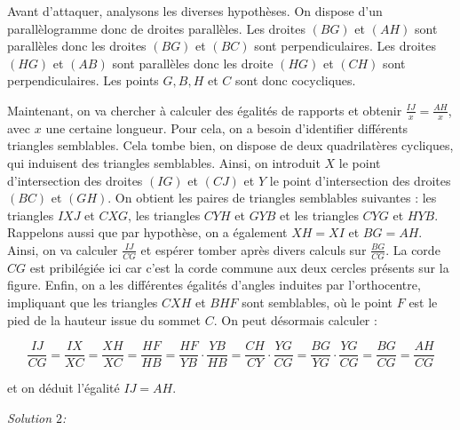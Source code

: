 \begin{sol}
Avant d'attaquer, analysons les diverses hypothèses. On dispose d'un parallèlogramme donc de droites parallèles. Les droites $(BG)$ et $(AH)$ sont parallèles donc les droites $(BG)$ et $(BC)$ sont perpendiculaires. Les droites $(HG)$ et $(AB)$ sont parallèles donc les droite $(HG)$ et $(CH)$ sont perpendiculaires. Les points $G,B,H$ et $C$ sont donc cocycliques.

Maintenant, on va chercher à calculer des égalités de rapports et obtenir $\frac{IJ}{x}=\frac{AH}{x}$, avec $x$ une certaine longueur. Pour cela, on a besoin d'identifier différents triangles semblables. Cela tombe bien, on dispose de deux quadrilatères cycliques, qui induisent des triangles semblables. Ainsi, on introduit $X$ le point d'intersection des droites $(IG)$ et $(CJ)$ et $Y$ le point d'intersection des droites $(BC)$ et $(GH)$. On obtient les paires de triangles semblables suivantes : les triangles $IXJ$ et $CXG$, les triangles $CYH$ et $GYB$ et les triangles $CYG$ et $HYB$. Rappelons aussi que par hypothèse, on a également $XH=XI$ et $BG=AH$. Ainsi, on va calculer $\frac{IJ}{CG}$ et espérer tomber après divers calculs sur $\frac{BG}{CG}$. La corde $CG$ est pribilégiée ici car c'est la corde commune aux deux cercles présents sur la figure. Enfin, on a les différentes égalités d'angles induites par l'orthocentre, impliquant que les triangles $CXH$ et $BHF$ sont semblables, où le point $F$ est le pied de la hauteur issue du sommet $C$. On peut désormais calculer :

$$\frac{IJ}{CG}=\frac{IX}{XC}=\frac{XH}{XC}=\frac{HF}{HB}=\frac{HF}{YB}\cdot \frac{YB}{HB}=\frac{CH}{CY}\cdot \frac{YG}{CG}=\frac{BG}{YG}\cdot \frac{YG}{CG}=\frac{BG}{CG}=\frac{AH}{CG}$$

et on déduit l'égalité $IJ=AH$.

\bigskip


\textit{Solution $2$:}

\begin{center}
\end{center}
\end{sol}

